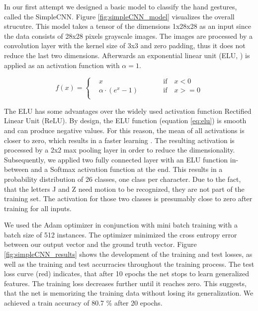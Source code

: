 \documentclass[a4paper]{article}
\begin{document}
In our first attempt we designed a basic model to classify the hand gestures, called the SimpleCNN. Figure \ref{fig:simpleCNN_model} visualizes the overall strucutre. This model takes a tensor of the dimensions 1x28x28 as an input since the data consists of 28x28 pixels grayscale images. The images are processed by a convolution layer with the kernel size of 3x3 and zero padding, thus it does not reduce the last two dimensions. Afterwards an exponential linear unit (ELU, \cite{clevert2015fast}) is applied as an activation function with $\alpha = 1$.
\vspace{-0.2cm}

\begin{equation}\label{eq:elu}
f(x) = \left\{\begin{alignedat}{2}
    & x && \qquad \text{if} \quad x < 0\\
    & \alpha \cdot (e^x - 1) && \qquad \text{if} \quad x >= 0\\
  \end{alignedat}\right.
\end{equation}

The ELU has some advantages over the widely used activation function Rectified Linear Unit (ReLU). By design, the ELU function (equation \ref{eq:elu}) is smooth and can produce negative values. For this reason, the mean of all activations is closer to zero, which results in a faster learning \cite{clever2015fast}.
The resulting activation is processed by a 2x2 max pooling layer in order to reduce the dimensionality. Subsequently, we applied two fully connected layer with an ELU function in-between and a Softmax activation function at the end. This results in a probability distribution of 26 classes, one class per character. Due to the fact, that the letters J and Z need motion to be recognized, they are not part of the training set. The activation for those two classes is presumably close to zero after training for all inputs.

We used the Adam optimizer \cite{Kingma2014} in conjunction with mini batch training with a batch size of 512 instances. The optimizer minimized the cross entropy error between our output vector and the ground truth vector. 
Figure \ref{fig:simpleCNN_results} shows the development of the training and test losses, as well as the training and test accurracies throughout the training process. The test loss curve (red) indicates, that after 10 epochs the net stops to learn generalized features. The training loss decreases further until it reaches zero. This suggests, that the net is memorizing the training data without losing its generalization. We achieved a train accuracy of 80.7 \% after 20 epochs.
\end{document}
